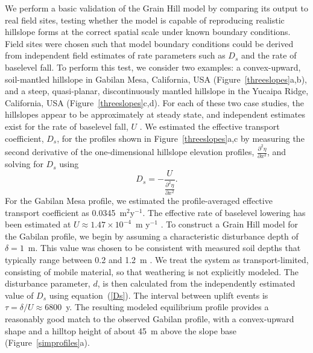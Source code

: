 \documentclass[esurf, manuscript]{copernicus}
\begin{document}
We perform a basic validation of the Grain Hill model by comparing its output to real field sites, testing whether the model is capable of reproducing realistic hillslope forms at the correct spatial scale under known boundary conditions. Field sites were chosen such that model boundary conditions could be derived from independent field estimates of rate parameters such as $D_s$ and the rate of baselevel fall. %
To perform this test, we consider two examples: a convex-upward, soil-mantled hillslope in Gabilan Mesa, California, USA (Figure~\ref{threeslopes}a,b), and a steep, quasi-planar, discontinuously mantled hillslope in the Yucaipa Ridge, California, USA (Figure~\ref{threeslopes}c,d). For each of these two case studies, the hillslopes appear to be approximately at steady state, and independent estimates exist for the rate of baselevel fall, $U$ \citep{binnie2007tectonic,perron2009formation,perron2012root}.  We estimated the effective transport coefficient, $D_s$,  for the profiles shown in Figure~\ref{threeslopes}a,c by measuring the second derivative of the one-dimensional hillslope elevation profiles, $\frac{\partial^2 \eta}{\partial x^2}$, and solving for  $D_s$ using
\begin{equation}
D_s = - \frac{U}{\frac{\partial^2 \eta}{\partial x^2}}.
\label{measureD}
\end{equation}
For the Gabilan Mesa profile, we  estimated the profile-averaged effective transport coefficient as 0.0345~m$^2$y$^{-1}$. The effective rate of baselevel lowering has been estimated at $U \approx 1.47\times 10^{-4}$~m y$^{-1}$ \citep{perron2012root}. To construct a Grain Hill model for the Gabilan profile, we begin by assuming a characteristic disturbance depth of $\delta=1$~m. This value was chosen to be consistent with measured soil depths that typically range between 0.2 and 1.2~m \citep{johnstone2017soil}. We treat the system as transport-limited, consisting of mobile material, so that weathering is not explicitly modeled. The disturbance parameter, $d$, is then calculated from the independently estimated value of $D_s$ using equation~(\ref{Ds}). The interval between uplift events is $\tau = \delta / U \approx 6800$~y. The resulting modeled equilibrium profile provides a reasonably good match to the observed Gabilan profile, with a convex-upward shape and a hilltop height of about 45~m above the slope base (Figure~\ref{simprofiles}a).
\end{document}
